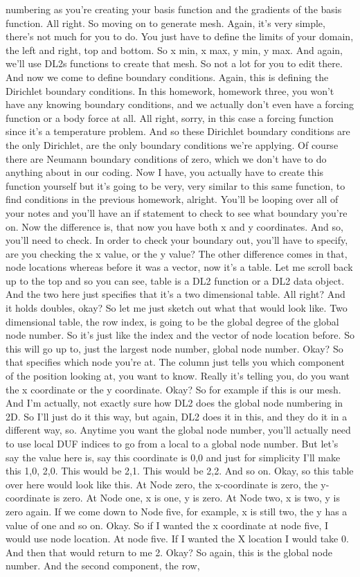 \documentclass[10pt]{article}
\begin{document}
numbering as you're creating your basis function and the gradients of the basis function. All right. So moving on to generate mesh. Again, it's very simple, there's not much for you to do. You just have to define the limits of your domain, the left and right, top and bottom. So x min, x max, y min, y max. And again, we'll use DL2s functions to create that mesh. So not a lot for you to edit there. And now we come to define boundary conditions. Again, this is defining the Dirichlet boundary conditions. In this homework, homework three, you won't have any knowing boundary conditions, and we actually don't even have a forcing function or a body force at all. All right, sorry, in this case a forcing function since it's a temperature problem. And so these Dirichlet boundary conditions are the only Dirichlet, are the only boundary conditions we're applying. Of course there are Neumann boundary conditions of zero, which we don't have to do anything about in our coding. Now I have, you actually have to create this function yourself but it's going to be very, very similar to this same function, to find conditions in the previous homework, alright. You'll be looping over all of your notes and you'll have an if statement to check to see what boundary you're on. Now the difference is, that now you have both x and y coordinates. And so, you'll need to check. In order to check your boundary out, you'll have to specify, are you checking the x value, or the y value? The other difference comes in that, node locations whereas before it was a vector, now it's a table. Let me scroll back up to the top and so you can see, table is a DL2 function or a DL2 data object. And the two here just specifies that it's a two dimensional table. All right? And it holds doubles, okay? So let me just sketch out what that would look like. Two dimensional table, the row index, is going to be the global degree of the global node number. So it's just like the index and the vector of node location before. So this will go up to, just the largest node number, global node number. Okay? So that specifies which node you're at. The column just tells you which component of the position looking at, you want to know. Really it's telling you, do you want the x coordinate or the y coordinate. Okay? So for example if this is our mesh. And I'm actually, not exactly sure how DL2 does the global node numbering in 2D. So I'll just do it this way, but again, DL2 does it in this, and they do it in a different way, so. Anytime you want the global node number, you'll actually need to use local DUF indices to go from a local to a global node number. But let's say the value here is, say this coordinate is 0,0 and just for simplicity I'll make this 1,0, 2,0. This would be 2,1. This would be 2,2. And so on. Okay, so this table over here would look like this. At Node zero, the x-coordinate is zero, the y-coordinate is zero. At Node one, x is one, y is zero. At Node two, x is two, y is zero again. If we come down to Node five, for example, x is still two, the y has a value of one and so on. Okay. So if I wanted the x coordinate at node five, I would use node location. At node five. If I wanted the X location I would take 0. And then that would return to me 2. Okay? So again, this is the global node number. And the second component, the row, 
\end{document}
